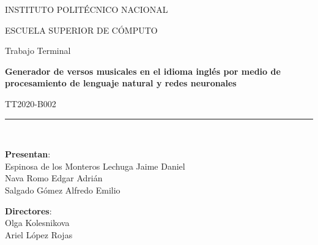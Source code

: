 \documentclass[12pt, a4paper, titlepage]{report}
\begin{document}
\begin{titlepage}
\vspace*{.25cm}								%
		
		\begin{center}
			
			\begin{LARGE}
				\textcolor{guindapoli}{INSTITUTO POLITÉCNICO NACIONAL}\\
			\end{LARGE}	
			
			\vspace*{0.2in}
			
			\begin{Large}
				\textcolor{azulescom}{ESCUELA SUPERIOR DE CÓMPUTO}\\
			\end{Large}		
			
			\vspace*{0.4in}
			
			\begin{large}
				Trabajo Terminal\\
			\end{large}
			
			\vspace*{0.2in}
			
			\begin{Large}
				\textbf{Generador de versos musicales en el idioma
inglés por medio de procesamiento de lenguaje
natural y redes neuronales}\\
			\end{Large}
			
			\vspace*{0.2in}
			
			\begin{large}
				TT2020-B002\\
			\end{large}
			
			\vspace*{0.2in}
			
			\rule{80mm}{.1mm}\\
			\vspace*{0.1in}
			
			\begin{large}
				\begin{center}
					\textbf{Presentan}:\\
					Espinosa de los Monteros Lechuga Jaime Daniel\\
					Nava Romo Edgar Adrián\\
					Salgado Gómez Alfredo Emilio\\
				\end{center}
			\end{large}
			
			\begin{large}
				\textbf{Directores}:\\
				Olga Kolesnikova\\
				Ariel López Rojas\\
			\end{large}
			
		\end{center}
	
	\end{titlepage}
\end{document}
